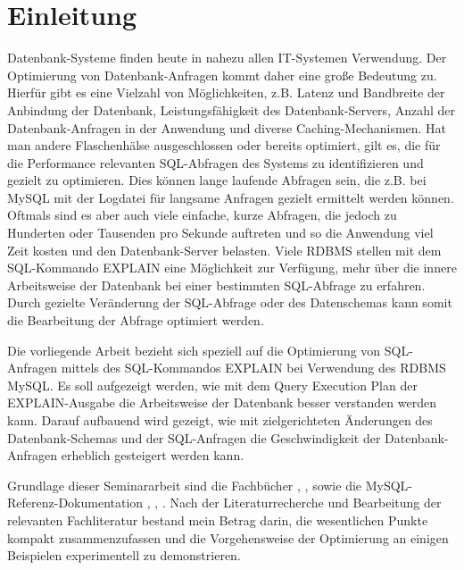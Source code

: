 \section{Einleitung}
Datenbank-Systeme finden heute in nahezu allen IT-Systemen Verwendung.
Der Optimierung von Datenbank-Anfragen kommt daher eine große Bedeutung zu.
Hierfür gibt es eine Vielzahl von Möglichkeiten, z.B. Latenz und Bandbreite der Anbindung der Datenbank, Leistungsfähigkeit des Datenbank-Servers, Anzahl der Datenbank-Anfragen in der Anwendung und diverse Caching-Mechanismen.
Hat man andere Flaschenhälse ausgeschlossen oder bereits optimiert, gilt es, die für die Performance relevanten SQL-Abfragen des Systems zu identifizieren und gezielt zu optimieren. Dies können lange laufende Abfragen sein, die z.B. bei MySQL mit der Logdatei für langsame Anfragen gezielt ermittelt werden können. Oftmals sind es aber auch viele einfache, kurze Abfragen, die jedoch zu Hunderten oder Tausenden pro Sekunde auftreten und so die Anwendung viel Zeit kosten und den Datenbank-Server belasten.
Viele RDBMS stellen mit dem SQL-Kommando EXPLAIN eine Möglichkeit zur Verfügung, mehr über die innere Arbeitsweise der Datenbank bei einer bestimmten SQL-Abfrage zu erfahren. Durch gezielte Veränderung der SQL-Abfrage oder des Datenschemas kann somit die Bearbeitung der Abfrage optimiert werden.

Die vorliegende Arbeit bezieht sich speziell auf die Optimierung von SQL-Anfragen mittels des SQL-Kommandos EXPLAIN bei Verwendung des RDBMS MySQL.
Es soll aufgezeigt werden, wie mit dem Query Execution Plan der EXPLAIN-Ausgabe die Arbeitsweise der Datenbank besser verstanden werden kann. Darauf aufbauend wird gezeigt, wie mit zielgerichteten Änderungen des Datenbank-Schemas und der SQL-Anfragen die Geschwindigkeit der Datenbank-Anfragen erheblich gesteigert werden kann.

Grundlage dieser Seminararbeit sind die Fachbücher \cite{Bradford2011}, \cite{Sauer1998}, \cite{Schwartz2009} sowie die MySQL-Referenz-Dokumentation \cite{refman1}, \cite{refman2}, \cite{refman3}.
Nach der Literaturrecherche und Bearbeitung der relevanten Fachliteratur bestand mein Betrag darin, die wesentlichen Punkte kompakt zusammenzufassen und die Vorgehensweise der Optimierung an einigen Beispielen experimentell zu demonstrieren.

